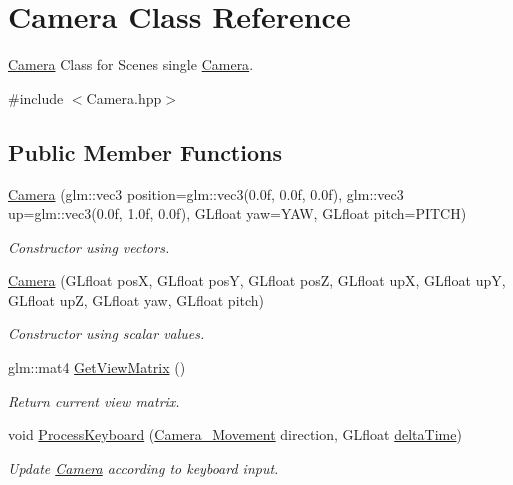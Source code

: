 \hypertarget{class_camera}{}\section{Camera Class Reference}
\label{class_camera}


\hyperlink{class_camera}{Camera} Class for Scene\textquotesingle{}s single \hyperlink{class_camera}{Camera}.  




{\ttfamily \#include $<$Camera.\+hpp$>$}

\subsection*{Public Member Functions}
\begin{DoxyCompactItemize}
\item 
\hyperlink{class_camera_a535f3a2413a88c2f1e7d1147bec0039c}{Camera} (glm\+::vec3 position=glm\+::vec3(0.\+0f, 0.\+0f, 0.\+0f), glm\+::vec3 up=glm\+::vec3(0.\+0f, 1.\+0f, 0.\+0f), G\+Lfloat yaw=\+Y\+A\+W, G\+Lfloat pitch=\+P\+I\+T\+C\+H)
\begin{DoxyCompactList}\small\item\em Constructor using vectors. \end{DoxyCompactList}\item 
\hypertarget{class_camera_a1efd973829c22d5fe15a26ede3357ee5}{}\label{class_camera_a1efd973829c22d5fe15a26ede3357ee5} 
\hyperlink{class_camera_a1efd973829c22d5fe15a26ede3357ee5}{Camera} (G\+Lfloat posX, G\+Lfloat posY, G\+Lfloat posZ, G\+Lfloat upX, G\+Lfloat upY, G\+Lfloat upZ, G\+Lfloat yaw, G\+Lfloat pitch)
\begin{DoxyCompactList}\small\item\em Constructor using scalar values. \end{DoxyCompactList}\item 
glm\+::mat4 \hyperlink{class_camera_affa333055635aed96518c4c66be9a70c}{Get\+View\+Matrix} ()
\begin{DoxyCompactList}\small\item\em Return current view matrix. \end{DoxyCompactList}\item 
void \hyperlink{class_camera_ac7e9a7f3e63c670fd695a8f03d02dbdf}{Process\+Keyboard} (\hyperlink{_camera_8hpp_a605494501af59c9191e7e4d6f9a0ebcb}{Camera\+\_\+\+Movement} direction, G\+Lfloat \hyperlink{main_8cpp_adf7cb443fa70a647d5603ee33b392102}{delta\+Time})
\begin{DoxyCompactList}\small\item\em Update \hyperlink{class_camera}{Camera} according to keyboard input. \end{DoxyCompactList}\item 

\end{DoxyCompactItemize}

